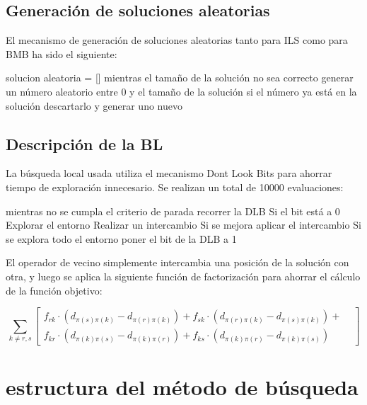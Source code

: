 \documentclass[twoside]{article}
\begin{document}
\subsection{Generación de soluciones aleatorias}

El mecanismo de generación de soluciones aleatorias tanto para ILS
como para BMB ha sido el siguiente:

\begin{pythoncode}
solucion aleatoria = []
mientras el tamaño de la solución no sea correcto
    generar un número aleatorio entre 0 y el tamaño de la solución
        si el número ya está en la solución descartarlo y generar uno nuevo
\end{pythoncode}

\subsection{Descripción de la BL}

La búsqueda local usada utiliza el mecanismo Dont Look Bits para ahorrar tiempo
de exploración innecesario. Se realizan un total de 10000 evaluaciones:

\begin{pythoncode}
mientras no se cumpla el criterio de parada
    recorrer la DLB
        Si el bit está a 0
            Explorar el entorno
                Realizar un intercambio
                Si se mejora aplicar el intercambio
            Si se explora todo el entorno poner el bit de la DLB a 1
\end{pythoncode}

El operador de vecino simplemente intercambia una posición de la solución
con otra, y luego se aplica la siguiente función de factorización para ahorrar
el cálculo de la función objetivo:

\begin{displaymath}
    \sum_{k \neq r,s}
\begin{bmatrix}
 f_{rk}\cdot (d_{\pi (s)\pi(k)} -  d_{\pi (r)\pi(k)})
+ f_{sk}\cdot (d_{\pi (r)\pi(k)} -  d_{\pi (s)\pi(k)}) +  & \\
f_{kr}\cdot (d_{\pi (k)\pi(s)} -  d_{\pi (k)\pi(r)})  +
f_{ks}\cdot (d_{\pi (k)\pi(r)} -  d_{\pi (k)\pi(s)})  &
\end{bmatrix}
\end{displaymath}


\section{estructura del método de búsqueda}
\end{document}
